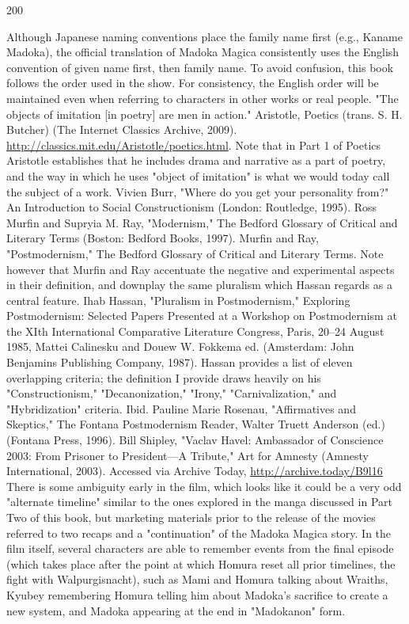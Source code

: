 \begin{thebibliography}{200}  

    Although Japanese naming conventions place the family name first (e.g., Kaname Madoka), the official translation of Madoka Magica consistently uses the English convention of given name first, then family name. To avoid confusion, this book follows the order used in the show. For consistency, the English order will be maintained even when referring to characters in other works or real people.
    "The objects of imitation [in poetry] are men in action." Aristotle, Poetics (trans. S. H. Butcher) (The Internet Classics Archive, 2009). \url{http://classics.mit.edu/Aristotle/poetics.html}. Note that in Part 1 of Poetics Aristotle establishes that he includes drama and narrative as a part of poetry, and the way in which he uses "object of imitation" is what we would today call the subject of a work.
    Vivien Burr, "Where do you get your personality from?" An Introduction to Social Constructionism (London: Routledge, 1995).
    Ross Murfin and Supryia M. Ray, "Modernism," The Bedford Glossary of Critical and Literary Terms (Boston: Bedford Books, 1997).
    Murfin and Ray, "Postmodernism," The Bedford Glossary of Critical and Literary Terms. Note however that Murfin and Ray accentuate the negative and experimental aspects in their definition, and downplay the same pluralism which Hassan regards as a central feature.
    Ihab Hassan, "Pluralism in Postmodernism," Exploring Postmodernism: Selected Papers Presented at a Workshop on Postmodernism at the XIth International Comparative Literature Congress, Paris, 20–24 August 1985, Mattei Calinesku and Douew W. Fokkema ed. (Amsterdam: John Benjamins Publishing Company, 1987). Hassan provides a list of eleven overlapping criteria; the definition I provide draws heavily on his "Constructionism," "Decanonization," "Irony," "Carnivalization," and "Hybridization" criteria.
    Ibid.
    Pauline Marie Rosenau, "Affirmatives and Skeptics," The Fontana Postmodernism Reader, Walter Truett Anderson (ed.) (Fontana Press, 1996).
    Bill Shipley, "Vaclav Havel: Ambassador of Conscience 2003: From Prisoner to President—A Tribute," Art for Amnesty (Amnesty International, 2003). Accessed via Archive Today, \url{http://archive.today/B9l16}
    There is some ambiguity early in the film, which looks like it could be a very odd "alternate timeline" similar to the ones explored in the manga discussed in Part Two of this book, but marketing materials prior to the release of the movies referred to two recaps and a "continuation" of the Madoka Magica story. In the film itself, several characters are able to remember events from the final episode (which takes place after the point at which Homura reset all prior timelines, the fight with Walpurgisnacht), such as Mami and Homura talking about Wraiths, Kyubey remembering Homura telling him about Madoka's sacrifice to create a new system, and Madoka appearing at the end in "Madokanon" form.

\end{thebibliography}
